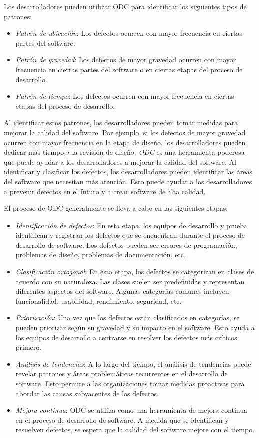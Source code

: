 \documentclass{dense_template}
\begin{document}
Los desarrolladores pueden utilizar ODC para identificar los siguientes tipos de patrones:
    \begin{itemize}
        \item \textit{Patrón de ubicación}: Los defectos ocurren con mayor frecuencia en ciertas partes del software.
        \item \textit{Patrón de gravedad}: Los defectos de mayor gravedad ocurren con mayor frecuencia en ciertas partes del software o en ciertas etapas del proceso de desarrollo.
        \item \textit{Patrón de tiempo}: Los defectos ocurren con mayor frecuencia en ciertas etapas del proceso de desarrollo.
    \end{itemize}

Al identificar estos patrones, los desarrolladores pueden tomar medidas para mejorar la calidad del software. Por ejemplo, si los defectos de mayor gravedad ocurren con mayor frecuencia en la etapa de diseño, los desarrolladores pueden dedicar más tiempo a la revisión de diseño.
\textit{ODC} es una herramienta poderosa que puede ayudar a los desarrolladores a mejorar la calidad del software. Al identificar y clasificar los defectos, los desarrolladores pueden identificar las áreas del software que necesitan más atención. Esto puede ayudar a los desarrolladores a prevenir defectos en el futuro y a crear software de alta calidad.

El proceso de ODC generalmente se lleva a cabo en las siguientes etapas:
    \begin{itemize}
        \item \textit{Identificación de defectos}: En esta etapa, los equipos de desarrollo y prueba identifican y registran los defectos que se encuentran durante el proceso de desarrollo de software. Los defectos pueden ser errores de programación, problemas de diseño, problemas de documentación, etc.
        \item \textit{Clasificación ortogonal}: En esta etapa, los defectos se categorizan en clases de acuerdo con su naturaleza. Las clases suelen ser predefinidas y representan diferentes aspectos del software. Algunas categorías comunes incluyen funcionalidad, usabilidad, rendimiento, seguridad, etc.
        \item \textit{Priorización}: Una vez que los defectos están clasificados en categorías, se pueden priorizar según su gravedad y su impacto en el software. Esto ayuda a los equipos de desarrollo a centrarse en resolver los defectos más críticos primero.
        \item \textit{Análisis de tendencias}: A lo largo del tiempo, el análisis de tendencias puede revelar patrones y áreas problemáticas recurrentes en el desarrollo de software. Esto permite a las organizaciones tomar medidas proactivas para abordar las causas subyacentes de los defectos.
        \item \textit{Mejora continua}: ODC se utiliza como una herramienta de mejora continua en el proceso de desarrollo de software. A medida que se identifican y resuelven defectos, se espera que la calidad del software mejore con el tiempo.
    \end{itemize}
\end{document}
